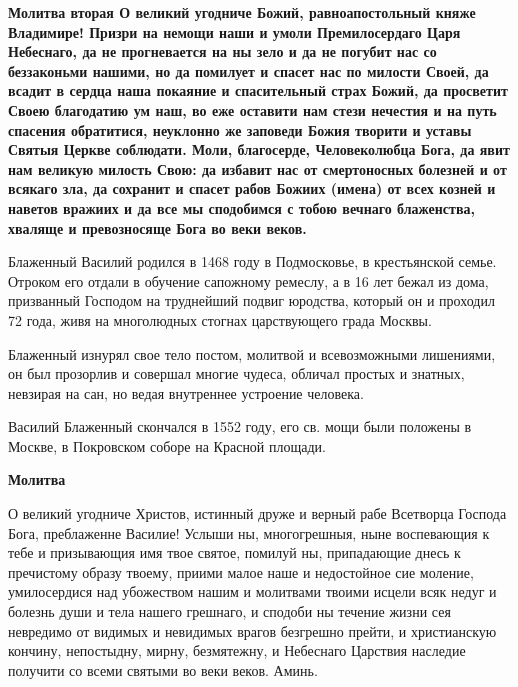 \medskip
\bfseries Молитва вторая\normalfont{}
О великий угодниче Божий, равноапостольный княже Владимире! Призри на немощи наши и умоли Премилосердаго Царя Небеснаго, да не прогневается на ны зело и да не погубит нас со беззаконьми нашими, но да помилует и спасет нас по милости Своей, да всадит в сердца наша покаяние и спасительный страх Божий, да просветит Своею благодатию ум наш, во еже оставити нам стези нечестия и на путь спасения обратитися, неуклонно же заповеди Божия творити и уставы Святыя Церкве соблюдати. Моли, благосерде, Человеколюбца Бога, да явит нам великую милость Свою: да избавит нас от смертоносных болезней и от всякаго зла, да сохранит и спасет рабов Божиих (имена) от всех козней и наветов вражиих и да все мы сподобимся с тобою вечнаго блаженства, хваляще и превозносяще Бога во веки веков.

\bigskip\bigskip\mychapterending

 
Блаженный Василий родился в 1468 году в Подмосковье, в крестьянской семье. Отроком его отдали в обучение сапожному ремеслу, а в 16 лет бежал из дома, призванный Господом на труднейший подвиг юродства, который он и проходил 72 года, живя на многолюдных стогнах царствующего града Москвы. 


Блаженный изнурял свое тело постом, молитвой и всевозможными лишениями, он был прозорлив и совершал многие чудеса, обличал простых и знатных, невзирая на сан, но ведая внутреннее устроение человека. 


Василий Блаженный скончался в 1552 году, его св. мощи были положены в Москве, в Покровском соборе на Красной площади.




\medskip
\bfseries Молитва\normalfont{}


О великий угодниче Христов, истинный друже и верный рабе Всетворца Господа Бога, преблаженне Василие! Услыши ны, многогрешныя, ныне воспевающия к тебе и призывающия имя твое святое, помилуй ны, припадающие днесь к пречистому образу твоему, приими малое наше и недостойное сие моление, умилосердися над убожеством нашим и молитвами твоими исцели всяк недуг и болезнь души и тела нашего грешнаго, и сподоби ны течение жизни сея невредимо от видимых и невидимых врагов безгрешно прейти, и христианскую кончину, непостыдну, мирну, безмятежну, и Небеснаго Царствия наследие получити со всеми святыми во веки веков. Аминь.


